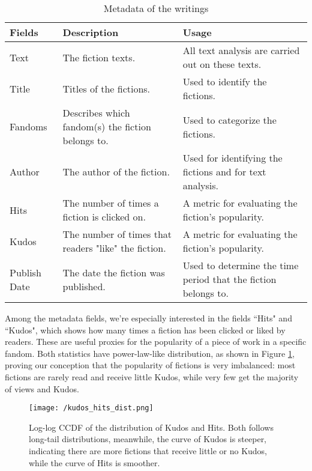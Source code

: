 \documentclass[11pt]{article} %
\begin{document}
\begin{table}[htp]
\caption{Metadata of the writings}
\begin{center}
\begin{tabular}[width=0.8\textwidth]{p{2cm}|p{3cm}|p{5cm}}
  \hline			
 Fields & Description & Usage\\ 
   \hline			
Text & The fiction texts. & All text analysis are carried out on these texts.\\
Title & Titles of the fictions. & Used to identify the fictions. \\
Fandoms & Describes which fandom(s) the fiction belongs to. & Used to categorize the fictions.\\
Author & The author of the fiction. & Used for identifying the fictions and for text analysis. \\
Hits & The number of times a fiction is clicked on. & A metric for evaluating the fiction's popularity. \\
Kudos & The number of times that readers "like" the fiction. &  A metric for evaluating the fiction's popularity.\\
Publish Date & The date the fiction was published. & Used to determine the time period that the fiction belongs to.\\
\hline
\end{tabular}
\end{center}
\label{tab:metadata}
\end{table}%

Among the metadata fields, we're especially interested in the fields ``Hits" and ``Kudos", which shows how many times a fiction has been clicked or liked by readers. These are useful proxies for the popularity of a piece of work in a specific fandom.
Both statistics have power-law-like distribution, as shown in  Figure \ref{fig:long_tail}, proving our conception that the popularity of fictions is very imbalanced: most fictions are rarely read and receive little Kudos, while very few get the majority of views and Kudos.

\begin{figure}[htbp]
\begin{center}
\texttt{[image: /kudos\_hits\_dist.png]}
\caption{Log-log CCDF of the distribution of Kudos and Hits. Both follows long-tail distributions, meanwhile, the curve of 
Kudos is steeper, indicating there are more fictions that receive little or no Kudos, while the curve of Hits is smoother. }
\label{fig:long_tail}
\end{center}
\end{figure}
\end{document}
